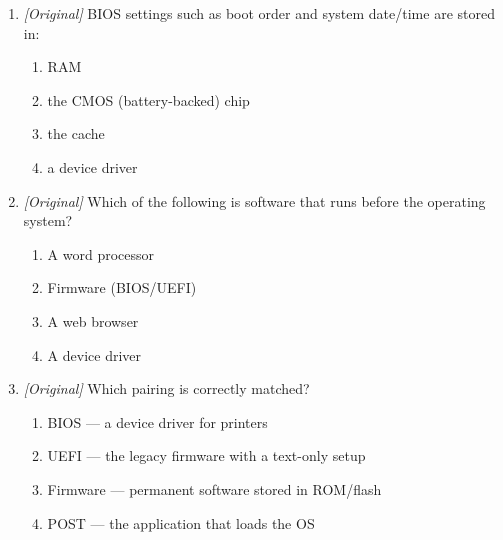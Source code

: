 \begin{enumerate}[label=\textbf{Q\arabic*.}, leftmargin=*]
\begin{enumerate}[label=\Roman*.]
    \item Device drivers are loaded by the operating system.
    \item The POST runs after the operating system has started.
  \end{enumerate}
  \begin{enumerate}[label=\Alph*.]
    \item I and II only
    \item I and III only
    \item II and III only
    \item I, II, and III
  \end{enumerate}
\item \textit{[Original]} BIOS settings such as boot order and system
  date/time are stored in:
  \begin{enumerate}[label=\Alph*.]
    \item RAM
    \item the CMOS (battery-backed) chip
    \item the cache
    \item a device driver
  \end{enumerate}
\item \textit{[Original]} Which of the following is software that runs before
  the operating system?
  \begin{enumerate}[label=\Alph*.]
    \item A word processor
    \item Firmware (BIOS/UEFI)
    \item A web browser
    \item A device driver
  \end{enumerate}
\item \textit{[Original]} Which pairing is correctly matched?
  \begin{enumerate}[label=\Alph*.]
    \item BIOS --- a device driver for printers
    \item UEFI --- the legacy firmware with a text-only setup
    \item Firmware --- permanent software stored in ROM/flash
    \item POST --- the application that loads the OS
  \end{enumerate}


\end{enumerate}
